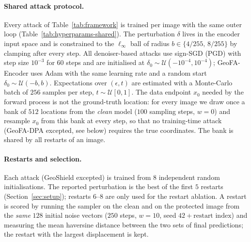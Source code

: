 \paragraph{Shared attack protocol.}
Every attack of Table~\ref{tab:framework} is trained per image with the same outer loop
(Table~\ref{tab:hyperparams-shared}). The perturbation $\delta$ lives in the encoder input
space and is constrained to the $\ell_\infty$ ball of radius
$b\in\{4/255,\,8/255\}$ by clamping after every step. All denoiser-based attacks use
sign-SGD (PGD) with step size $10^{-3}$ for $60$ steps and are initialised at
$\delta_0\sim\mathcal{U}(-10^{-4},10^{-4})$; GeoFA-Encoder uses Adam with the same learning
rate and a random start $\delta_0\sim\mathcal{U}(-b,b)$. Expectations over $(\epsilon,t)$ are
estimated with a Monte-Carlo batch of $256$ samples per step, $t\sim\mathcal{U}[0,1]$. The data
endpoint $x_0$ needed by the forward process is not the ground-truth location: for every image
we draw once a bank of $512$ locations from the \emph{clean} model ($100$ sampling steps,
$w=0$) and resample $x_0$ from this bank at every step, so that no training-time attack
(GeoFA-DPA excepted, see below) requires the true coordinates. The bank is shared by all
restarts of an image.

\paragraph{Restarts and selection.}
Each attack (GeoShield excepted) is trained from $8$ independent random initialisations.
The reported perturbation is the best of the first $5$ restarts (Section~\ref{sec:setup});
restarts $6$--$8$ are only used for the restart ablation. A restart is scored by running the
sampler on the clean and on the protected image from the \emph{same} $128$ initial noise
vectors ($250$ steps, $w=10$, seed $42{+}\text{restart index}$) and measuring the mean
haversine distance between the two sets of final predictions; the restart with the largest
displacement is kept.

